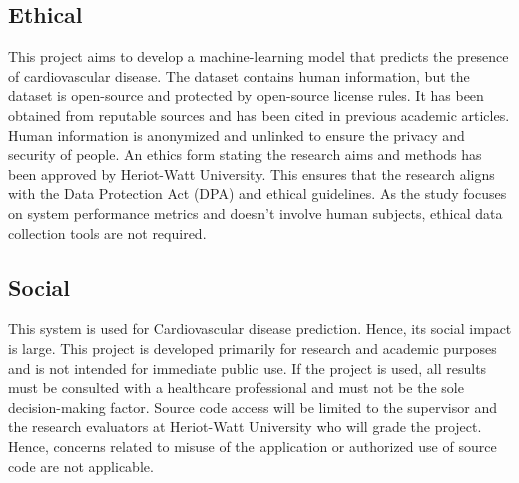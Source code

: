 \subsection{Ethical}
This project aims to develop a machine-learning model that predicts the presence of cardiovascular disease. The dataset contains human information, but the dataset is open-source and protected by open-source license rules. It has been obtained from reputable sources and has been cited in previous academic articles. Human information is anonymized and unlinked to ensure the privacy and security of people. An ethics form stating the research aims and methods has been approved by Heriot-Watt University. This ensures that the research aligns with the Data Protection Act (DPA) and ethical guidelines. As the study focuses on system performance metrics and doesn’t involve human subjects, ethical data collection tools are not required.

\subsection{Social}
This system is used for Cardiovascular disease prediction. Hence, its social impact is large. This project is developed primarily for research and academic purposes and is not intended for immediate public use. If the project is used, all results must be consulted with a healthcare professional and must not be the sole decision-making factor. Source code access will be limited to the supervisor and the research evaluators at Heriot-Watt University who will grade the project. Hence, concerns related to misuse of the application or authorized use of source code are not applicable.